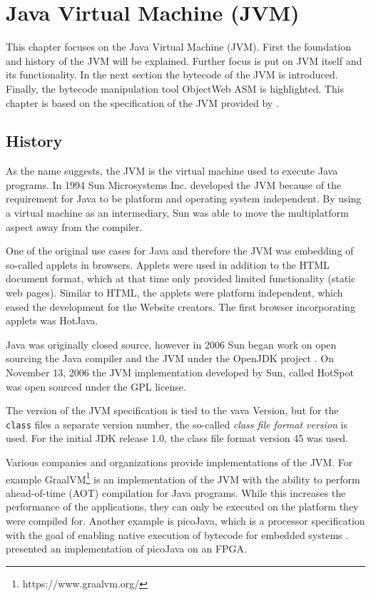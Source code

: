 \chapter{Java Virtual Machine (JVM)}

This chapter focuses on the Java Virtual Machine (JVM). First the foundation and history of the JVM will be explained. Further focus is put on JVM itself and its functionality. In the next section the bytecode of the JVM is introduced. Finally, the bytecode manipulation tool ObjectWeb ASM is highlighted. This chapter is based on the specification of the JVM provided by \textcite{JVMHistoryOracle}.

\section{History}

 As the name suggests, the JVM is the virtual machine used to execute Java programs. In 1994 Sun Microsystems Inc. developed the JVM because of the requirement for Java to be platform and operating system independent. By using a virtual machine as an intermediary, Sun was able to move the multiplatform aspect away from the compiler. 

One of the original use cases for Java and therefore the JVM was embedding of so-called applets in browsers. Applets were used in addition to the HTML document format, which at that time only provided limited functionality (static web pages). Similar to HTML, the applets were platform independent, which eased the development for the Website creators. The first browser incorporating applets was HotJava. 

Java was originally closed source, however in 2006 Sun began work on open sourcing the Java compiler and the JVM under the OpenJDK project \parencite{SunOpenSourceJava}. On November 13, 2006 the JVM implementation developed by Sun, called HotSpot was open sourced under the GPL license.

The version of the JVM specification is tied to the vava Version, but for the \texttt{class} files a separate version number, the so-called \textit{class file format version} is used. For the initial JDK release 1.0, the class file format version 45 was used. 

Various companies and organizations provide implementations of the JVM. For example GraalVM\footnote{https://www.graalvm.org/} is an implementation of the JVM with the ability to perform ahead-of-time (AOT) compilation for Java programs. While this increases the performance of the applications, they can only be executed on the platform they were compiled for. Another example is picoJava, which is a processor specification with the goal of enabling native execution of bytecode for embedded systems \parencite{PicoJava}. \textcite{PicoJavaFPGA} presented an implementation of picoJava on an FPGA.




